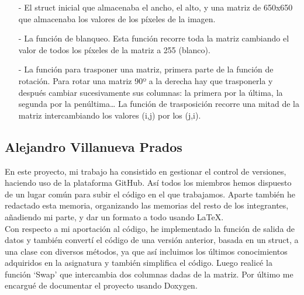 \documentclass[a4paper, 11pt, spanish]{article}
\begin{document}
\begin{itemize}

\item[-] El struct inicial que almacenaba el ancho, el alto, y una matriz de 650x650 que almacenaba los valores de los píxeles de la imagen.

\item[-] La función de blanqueo. Esta función recorre toda la matriz cambiando el valor de todos los píxeles de la matriz a 255 (blanco).

\item[-] La función para trasponer una matriz, primera parte de la función de rotación. Para rotar una matriz 90º a la derecha hay que trasponerla y después cambiar sucesivamente sus columnas: la primera por la última, la segunda por la penúltima… La función de trasposición recorre una mitad de la matriz intercambiando los valores (i,j) por los (j,i).

\end{itemize}


\subsection{Alejandro Villanueva Prados}

En este proyecto, mi trabajo ha consistido en gestionar el control de versiones, haciendo uso de la plataforma GitHub. Así todos los miembros hemos dispuesto de un lugar común para subir el código en el que trabajamos. Aparte también he redactado esta memoria, organizando las memorias del resto de los integrantes, añadiendo mi parte, y dar un formato a todo usando \LaTeX.
\\

Con respecto a mi aportación al código, he implementado la función de salida de datos y también convertí el código de una versión anterior, basada en un struct, a una clase con diversos métodos, ya que así incluimos los últimos conocimientos adquiridos en la asignatura y también simplifica el código. Luego realicé la función `Swap' que intercambia dos columnas dadas de la matriz. Por último me encargué de documentar el proyecto usando Doxygen.
\end{document}
